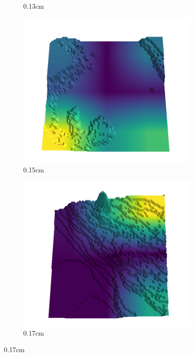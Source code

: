 \begin{figure}[H]
\begin{subfigure}[b]{0.192\linewidth}
    \caption{0.13cm}
    \label{fig : quarry-worst-17}
    \end{subfigure}
    \begin{subfigure}[b]{0.192\linewidth}
    \includegraphics[width=\linewidth]{../img/5/quarry/worst/15-patch-3d-majavi-colormap-180.png}
    \caption{0.15cm}
    \label{fig : quarry-worst-18}
    \end{subfigure}
    \begin{subfigure}[b]{0.192\linewidth}
    \includegraphics[width=\linewidth]{../img/5/quarry/worst/17-patch-3d-majavi-colormap-190.png}
    \caption{0.17cm}
    \label{fig : quarry-worst-19}
    \end{subfigure}
    \label{fig : quarry-worst}
    \end{figure}

